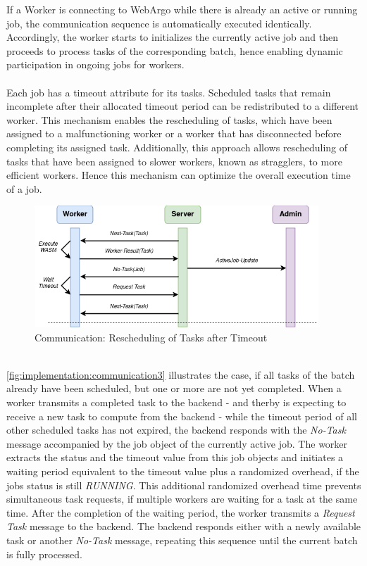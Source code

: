 If a Worker is connecting to WebArgo while there is already an active or running job, the communication sequence is automatically executed identically. Accordingly, the worker starts to initializes the currently active job and then proceeds to process tasks of the corresponding batch, hence enabling dynamic participation in ongoing jobs for workers.
\\~\\
Each job has a timeout attribute for its tasks. Scheduled tasks that remain incomplete after their allocated timeout period can be redistributed to a different worker. This mechanism enables the rescheduling of tasks, which have been assigned to a malfunctioning worker or a worker that has disconnected before completing its assigned task. Additionally, this approach allows rescheduling of tasks that have been assigned to slower workers, known as stragglers, to more efficient workers. Hence this mechanism can optimize the overall execution time of a job.
\begin{figure}[htbp]
    \centering
    \includegraphics[width=0.95\textwidth]{gfx/figures/communication-timeout.png}
    \caption{Communication: Rescheduling of Tasks after Timeout}
    \label{fig:implementation:communication3}
\end{figure}
~\\
\autoref{fig:implementation:communication3} illustrates the case, if all tasks of the batch already have been scheduled, but one or more are not yet completed. When a worker transmits a completed task to the backend - and therby is expecting to receive a new task to compute from the backend - while the timeout period of all other scheduled tasks has not expired, the backend responds with the \emph{No-Task} message accompanied by the job object of the currently active job. The worker extracts the status and the timeout value from this job objects and initiates a waiting period equivalent to the timeout value plus a randomized overhead, if the jobs status is still \emph{RUNNING}. This additional randomized overhead time prevents simultaneous task requests, if multiple workers are waiting for a task at the same time. After the completion of the waiting period, the worker transmits a \emph{Request Task} message to the backend. The backend responds either with a newly available task or another \emph{No-Task} message, repeating this sequence until the current batch is fully processed.

